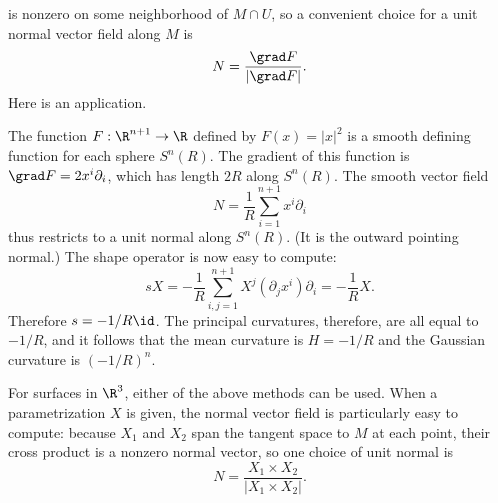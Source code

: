 is nonzero on some neighborhood of $M\cap U$, so a convenient choice for a unit normal vector field along $M$ is
\[N=\frac{\grad F}{|\grad F|}.\]
Here is an application.
\begin{example}\label{shape operator sphere}
The function $F:\R^{n+1}\to\R$ defined by $F(x)=|x|^2$ is a smooth defining function for each sphere $S^n(R)$. The gradient of this function is $\grad F=2x^i\partial_i$, 
which has length $2R$ along $S^n(R)$. The smooth vector field
\[N=\frac{1}{R}\sum_{i=1}^{n+1}x^i\partial_i\]
thus restricts to a unit normal along $S^n(R)$. (It is the outward pointing normal.) The shape operator is now easy to compute:
\[sX=-\frac{1}{R}\sum_{i,j=1}^{n+1}X^j(\partial_jx^i)\partial_i=-\frac{1}{R}X.\]
Therefore $s=-1/R\id$. The principal curvatures, therefore, are all equal to $-1/R$, and it follows that the mean curvature is $H=-1/R$ and the Gaussian curvature is $(-1/R)^n$.
\end{example}
For surfaces in $\R^3$, either of the above methods can be used. When a parametrization $X$ is given, the normal vector field is particularly easy to compute: because 
$X_1$ and $X_2$ span the tangent space to $M$ at each point, their cross product is a nonzero normal vector, so one choice of unit normal is
\[N=\frac{X_1\times X_2}{|X_1\times X_2|}.\]
